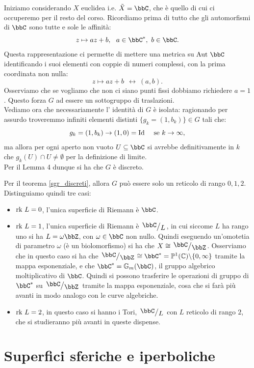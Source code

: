 Iniziamo considerando $X$ euclidea i.e. $\tilde{X}=\bbC$, che è quello di cui ci occuperemo per il resto del corso. Ricordiamo prima di tutto che gli automorfismi di $\bbC$ sono tutte e sole le affinità:
$$
z\mapsto az+b,\ \ a\in\bbC^*,\ b\in \bbC.
$$
Questa rappresentazione ci permette di mettere una metrica su $\Aut{\bbC}$ identificando i suoi elementi con coppie di numeri complessi, con la prima coordinata non nulla:
$$
z\mapsto az+b\ \ \leftrightarrow\  (a,b).
$$
Osserviamo che se vogliamo che non ci siano punti fissi dobbiamo richiedere $a=1$. Questo forza $G$ ad essere un sottogruppo di traslazioni.\\
Vediamo ora che necessariamente l' identità di $G$ è isolata: ragionando per assurdo troveremmo infiniti elementi distinti $\{ g_k=(1,b_k) \}\in G$ tali che:
$$
g_k=(1,b_k)\rightarrow (1,0)=\Id\ \ \ \mbox{ se } k \rightarrow \infty,
$$
ma allora per ogni aperto non vuoto $U\subseteq \bbC$ si avrebbe definitivamente in $k$ che $g_k(U)\cap U\neq \emptyset$ per la definizione di limite.\\
Per il Lemma 4 dunque si ha che $G$ è discreto.

Per il teorema \ref{sgr_discreti}, allora $G$ può essere solo un reticolo di rango $0,1,2$. Distinguiamo quindi tre casi:
\begin{itemize}
\item $\mbox{rk } L=0$, l'unica superficie di Riemann è $\bbC$.
\item $\mbox{rk } L=1$, l'unica superficie di Riemann è $\quotient{\bbC}{L}$, in cui siccome $L$ ha rango uno si ha $L=\omega \bbZ$, con $\omega\in\bbC$ non nullo. Quindi eseguendo un'omotetia di parametro $\omega$ (è un biolomorfismo) si ha che $X\cong \quotient{\bbC}{\bbZ}$.
Osserviamo che in questo caso si ha che $\quotient{\bbC}{\bbZ}\cong \bbC^{*}=\mathbb{P}^1(\mathbb{C})\minus\{0,\infty\}$ tramite la mappa esponenziale, e che $\bbC^{*}=\mathbb{G}_m(\bbC)$, il gruppo algebrico moltiplicativo di $\bbC$. Quindi si possono trasferire le operazioni di gruppo di $\bbC^{*}$ su $\quotient{\bbC}{\bbZ}$ tramite la mappa esponenziale, cosa che si farà più avanti in modo analogo con le curve algebriche.
\item $\mbox{rk } L=2$, in questo caso si hanno i Tori, $\quotient{\bbC}{L}$ con $L$ reticolo di rango $2$, che si studieranno più avanti in queste dispense.
\end{itemize}


\section{Superfici sferiche e iperboliche}

